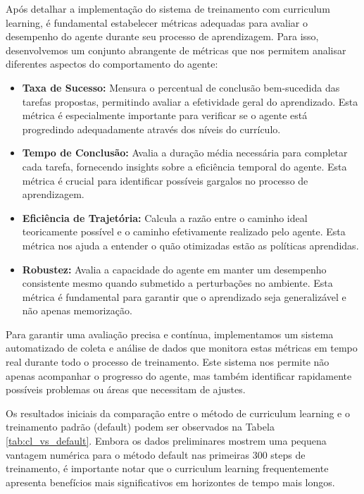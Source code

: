 Após detalhar a implementação do sistema de treinamento com curriculum learning, é fundamental estabelecer métricas adequadas para avaliar o desempenho do agente durante seu processo de aprendizagem. Para isso, desenvolvemos um conjunto abrangente de métricas que nos permitem analisar diferentes aspectos do comportamento do agente:

\begin{itemize}
    \item \textbf{Taxa de Sucesso:} Mensura o percentual de conclusão bem-sucedida das tarefas propostas, permitindo avaliar a efetividade geral do aprendizado. Esta métrica é especialmente importante para verificar se o agente está progredindo adequadamente através dos níveis do currículo.
    
    \item \textbf{Tempo de Conclusão:} Avalia a duração média necessária para completar cada tarefa, fornecendo insights sobre a eficiência temporal do agente. Esta métrica é crucial para identificar possíveis gargalos no processo de aprendizagem.
    
    \item \textbf{Eficiência de Trajetória:} Calcula a razão entre o caminho ideal teoricamente possível e o caminho efetivamente realizado pelo agente. Esta métrica nos ajuda a entender o quão otimizadas estão as políticas aprendidas.
    
    \item \textbf{Robustez:} Avalia a capacidade do agente em manter um desempenho consistente mesmo quando submetido a perturbações no ambiente. Esta métrica é fundamental para garantir que o aprendizado seja generalizável e não apenas memorização.
\end{itemize}

Para garantir uma avaliação precisa e contínua, implementamos um sistema automatizado de coleta e análise de dados que monitora estas métricas em tempo real durante todo o processo de treinamento. Este sistema nos permite não apenas acompanhar o progresso do agente, mas também identificar rapidamente possíveis problemas ou áreas que necessitam de ajustes.

Os resultados iniciais da comparação entre o método de curriculum learning e o treinamento padrão (default) podem ser observados na Tabela \ref{tab:cl_vs_default}. Embora os dados preliminares mostrem uma pequena vantagem numérica para o método default nas primeiras 300 steps de treinamento, é importante notar que o curriculum learning frequentemente apresenta benefícios mais significativos em horizontes de tempo mais longos.

